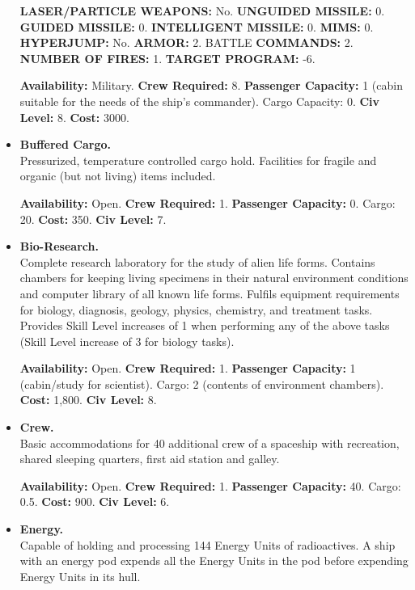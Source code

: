 \begin{itemize}
  \textbf{LASER/PARTICLE WEAPONS:} No. \textbf{UNGUIDED MISSILE:} 0.
  \textbf{GUIDED MISSILE:} 0.  \textbf{INTELLIGENT MISSILE:} 0.
  \textbf{MIMS:} 0.  \textbf{HYPERJUMP:} No. \textbf{ARMOR:} 2. BATTLE
  \textbf{COMMANDS:} 2. \textbf{NUMBER OF FIRES:} 1. \textbf{TARGET
    PROGRAM:} -6.

  
  \textbf{Availability:} Military. \textbf{Crew Required:} 8.
  \textbf{Passenger Capacity:} 1 (cabin suitable for the needs of the
  ship's commander).  Cargo Capacity: 0. \textbf{Civ Level:} 8.
  \textbf{Cost:} 3000.
  
  

\item\textbf{Buffered Cargo.}\\
  Pressurized, temperature controlled cargo hold. Facilities for
  fragile and organic (but not living) items included.

  
  \textbf{Availability:} Open. \textbf{Crew Required:} 1.
  \textbf{Passenger Capacity:} 0. Cargo: 20. \textbf{Cost:} 350.
  \textbf{Civ Level:} 7.
  
  

\item\textbf{Bio-Research.}\\
  Complete research laboratory for the study of alien life forms.
  Contains chambers for keeping living specimens in their natural
  environment conditions and computer library of all known life forms.
  Fulfils equipment requirements for biology, diagnosis, geology,
  physics, chemistry, and treatment tasks. Provides Skill Level
  increases of 1 when performing any of the above tasks (Skill Level
  increase of 3 for biology tasks).

  
  \textbf{Availability:} Open. \textbf{Crew Required:} 1.
  \textbf{Passenger Capacity:} 1 (cabin/study for scientist). Cargo: 2
  (contents of environment chambers). \textbf{Cost:} 1,800.
  \textbf{Civ Level:} 8.
  
  

\item\textbf{Crew.}\\
  Basic accommodations for 40 additional crew of a spaceship with
  recreation, shared sleeping quarters, first aid station and galley.

  
  \textbf{Availability:} Open. \textbf{Crew Required:} 1.
  \textbf{Passenger Capacity:} 40. Cargo: 0.5. \textbf{Cost:} 900.
  \textbf{Civ Level:} 6.
  
  

\item\textbf{Energy.}\\
  Capable of holding and processing 144 Energy Units of radioactives.
  A ship with an energy pod expends all the Energy Units in the pod
  before expending Energy Units in its hull.


\end{itemize}
